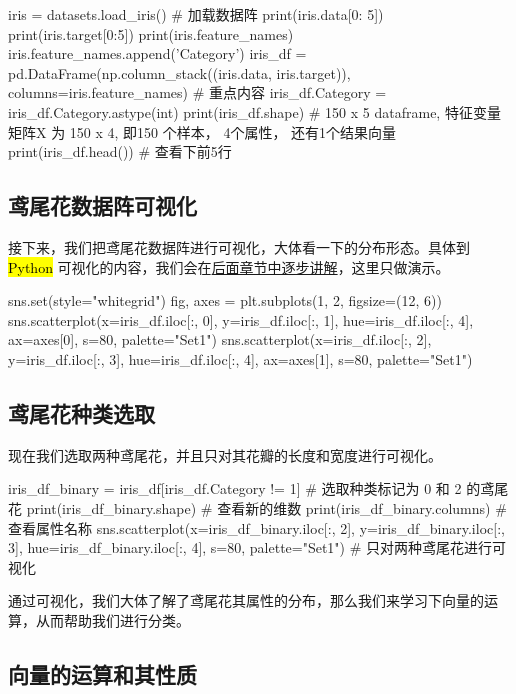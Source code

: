 \documentclass[11pt]{article}
\theoremstyle{definition}
\numberwithin{equation}{section}
\newcommand{\hlc}[2][pink]{{%
    \colorlet{foo}{#1}%
    \sethlcolor{foo}\hl{#2}}%
}
\begin{document}
\begin{python}
iris = datasets.load_iris()  # 加载数据阵
print(iris.data[0: 5])
print(iris.target[0:5])
print(iris.feature_names) 
iris.feature_names.append('Category')
iris_df = pd.DataFrame(np.column_stack((iris.data, iris.target)),
                       columns=iris.feature_names)  # 重点内容
iris_df.Category = iris_df.Category.astype(int)
print(iris_df.shape)  # 150 x 5 dataframe, 特征变量矩阵X 为 150 x 4, 即150 个样本， 4个属性， 还有1个结果向量
print(iris_df.head())  # 查看下前5行
\end{python}


\subsection{鸢尾花数据阵可视化}

接下来，我们把鸢尾花数据阵进行可视化，大体看一下的分布形态。具体到\hlc{Python}可视化的内容，我们会在\underline{后面章节中逐步讲解}，这里只做演示。
\begin{python}
sns.set(style="whitegrid")  
fig, axes = plt.subplots(1, 2, figsize=(12, 6))
sns.scatterplot(x=iris_df.iloc[:, 0],
                y=iris_df.iloc[:, 1],
                hue=iris_df.iloc[:, 4],
                ax=axes[0], s=80, palette="Set1")
sns.scatterplot(x=iris_df.iloc[:, 2],
                y=iris_df.iloc[:, 3],
                hue=iris_df.iloc[:, 4],
                ax=axes[1], s=80, palette="Set1")
\end{python}


\subsection{鸢尾花种类选取}

现在我们选取两种鸢尾花，并且只对其花瓣的长度和宽度进行可视化。
\begin{python}
iris_df_binary = iris_df[iris_df.Category != 1]  # 选取种类标记为 0 和 2 的鸢尾花
print(iris_df_binary.shape)  # 查看新的维数
print(iris_df_binary.columns)  # 查看属性名称
sns.scatterplot(x=iris_df_binary.iloc[:, 2],
                y=iris_df_binary.iloc[:, 3],
                hue=iris_df_binary.iloc[:, 4],
                s=80, palette="Set1")  # 只对两种鸢尾花进行可视化
\end{python}

通过可视化，我们大体了解了鸢尾花其属性的分布，那么我们来学习下向量的运算，从而帮助我们进行分类。

\subsection{向量的运算和其性质}
\end{document}
